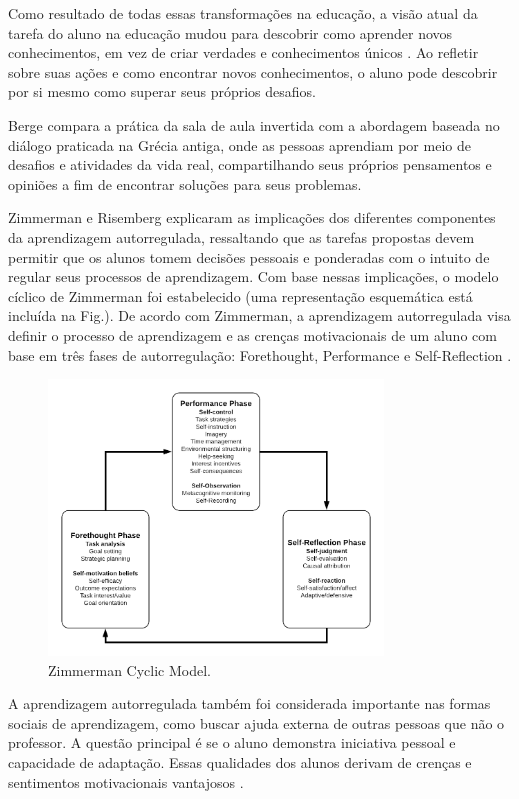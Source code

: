 Como resultado de todas essas transformações na educação, a visão atual da tarefa do aluno na educação mudou para descobrir como aprender novos conhecimentos, em vez de criar verdades e conhecimentos únicos \cite{ebert_school:_2013}. Ao refletir sobre suas ações e como encontrar novos conhecimentos, o aluno pode descobrir por si mesmo como superar seus próprios desafios.

Berge \cite{berge_computer_1995} compara a prática da sala de aula invertida com a abordagem baseada no diálogo praticada na Grécia antiga, onde as pessoas aprendiam por meio de desafios e atividades da vida real, compartilhando seus próprios pensamentos e opiniões a fim de encontrar soluções para seus problemas.

Zimmerman e Risemberg \cite{zimmerman_chapter_1997} explicaram as implicações dos diferentes componentes da aprendizagem autorregulada, ressaltando que as tarefas propostas devem permitir que os alunos tomem decisões pessoais e ponderadas com o intuito de regular seus processos de aprendizagem. Com base nessas implicações, o modelo cíclico de Zimmerman \cite{zimmerman_chapter_2000} foi estabelecido (uma representação esquemática está incluída na Fig.). De acordo com Zimmerman, a aprendizagem autorregulada visa definir o processo de aprendizagem e as crenças motivacionais de um aluno com base em três fases de autorregulação: Forethought, Performance e Self-Reflection \cite {zimmerman_investigating_2008}.

\begin{figure}[!t]
\centering
\includegraphics[width=3.5in]{chaps/Images/Zimmerman.png}
\caption{Zimmerman Cyclic Model.}
\label{fig:Zimmerman Model}
\end{figure}

A aprendizagem autorregulada também foi considerada importante nas formas sociais de aprendizagem, como buscar ajuda externa de outras pessoas que não o professor. A questão principal é se o aluno demonstra iniciativa pessoal e capacidade de adaptação. Essas qualidades dos alunos derivam de crenças e sentimentos motivacionais vantajosos \cite{zimmerman_chapter_2000}.

